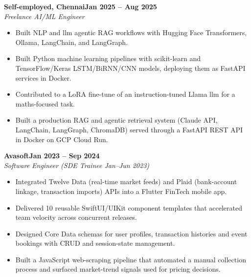 \documentclass[a4paper,11pt]{article}
\newcommand{\entry}[4]{\needspace{4\baselineskip}\noindent\textbf{#1}\hfill\textbf{#2}\\ \textit{#3}\hfill\textit{#4}\par}
\begin{document}
\vspace{4pt}
\entry{Self-employed, Chennai}{Jan 2025 – Aug 2025}{Freelance AI/ML Engineer}{}
\begin{itemize}
  \item Built NLP and llm agentic RAG workflows with Hugging Face Transformers, Ollama, LangChain, and LangGraph.
  \item Built Python machine learning pipelines with scikit-learn and TensorFlow/Keras LSTM/BiRNN/CNN models, deploying them as FastAPI services in Docker.
  \item Contributed to a LoRA fine-tune of an instruction-tuned Llama llm for a maths-focused task.
  \item Built a production RAG and agentic retrieval system (Claude API, LangChain, LangGraph, ChromaDB) served through a FastAPI REST API in Docker on GCP Cloud Run.
\end{itemize}
\vspace{4pt}
\entry{Avasoft}{Jan 2023 – Sep 2024}{Software Engineer (SDE Trainee Jan–Jun 2023)}{}
\begin{itemize}
  \item Integrated Twelve Data (real-time market feeds) and Plaid (bank-account linkage, transaction imports) APIs into a Flutter FinTech mobile app.
  \item Delivered 10 reusable SwiftUI/UIKit component templates that accelerated team velocity across concurrent releases.
  \item Designed Core Data schemas for user profiles, transaction histories and event bookings with CRUD and session-state management.
  \item Built a JavaScript web-scraping pipeline that automated a manual collection process and surfaced market-trend signals used for pricing decisions.
\end{itemize}

\end{document}
